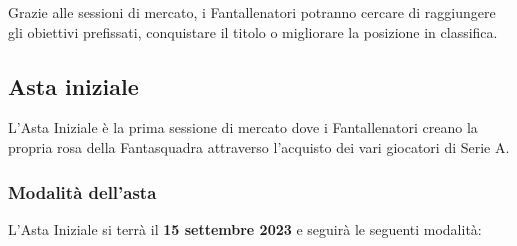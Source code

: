 \documentclass[12pt]{article}
\begin{document}
Grazie alle sessioni di mercato, i Fantallenatori potranno cercare di raggiungere gli obiettivi prefissati, conquistare il titolo o migliorare la posizione in classifica.

\subsection{Asta iniziale}

L'Asta Iniziale è la prima sessione di mercato dove i Fantallenatori creano la propria rosa della Fantasquadra attraverso l'acquisto dei vari giocatori di Serie A.

\subsubsection*{Modalità dell'asta}
\label{subsec:asta-iniziale}

L'Asta Iniziale si terrà il \textbf{15 settembre 2023} e seguirà le seguenti modalità:
\end{document}

